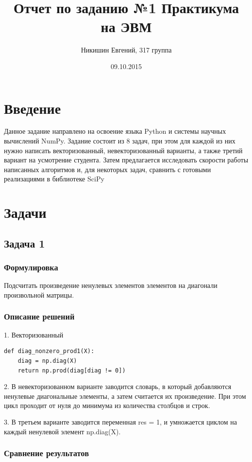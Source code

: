\documentclass[12pt]{article}
\title{Отчет по заданию №1 Практикума на ЭВМ}
\author{Никишин Евгений, 317 группа}
\date{09.10.2015}
\begin{document}
\maketitle

\tableofcontents

\section{Введение}

Данное задание направлено на освоение языка Python и системы научных вычислений NumPy. Задание состоит из 8 задач, при этом для каждой из них нужно написать векторизованный, невекторизованный варианты, а также третий вариант на усмотрение студента. Затем предлагается исследовать скорости работы написанных алгоритмов и, для некоторых задач, сравнить с готовыми реализациями в библиотеке SciPy

\section{Задачи}
\subsection{Задача 1}

\subsubsection*{Формулировка}

Подсчитать произведение ненулевых элементов элементов на диагонали произвольной матрицы.

\subsubsection*{Описание решений}

1. Векторизованный
\begin{lstlisting}
def diag_nonzero_prod1(X):
    diag = np.diag(X)
    return np.prod(diag[diag != 0])
\end{lstlisting}

2. В невекторизованном варианте заводится словарь, в который добавляются ненулевые диагональные элементы, а затем считается их произведение. При этом цикл проходит от нуля до минимума из количества столбцов и строк.

3. В третьем варианте заводится переменная res = 1, и умножается циклом на каждый ненулевой элемент np.diag(X).

\subsubsection*{Сравнение результатов}
\end{document}
